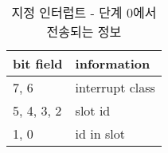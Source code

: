 %
%
\begin{table}[htbp]
\caption{지정 인터럽트 - 단계 0에서 전송되는 정보}\label{table:dir-int-p0}
   \begin{center}
   \begin{tabular}{|l|l|} \hline
	bit field & information \\
\hline \hline
	7, 6 & interrupt class \\ \hline
	5, 4, 3, 2 & slot id \\ \hline
	1, 0 & id in slot \\
\hline
   \end{tabular}
   \end{center}
\end{table}
%
%
